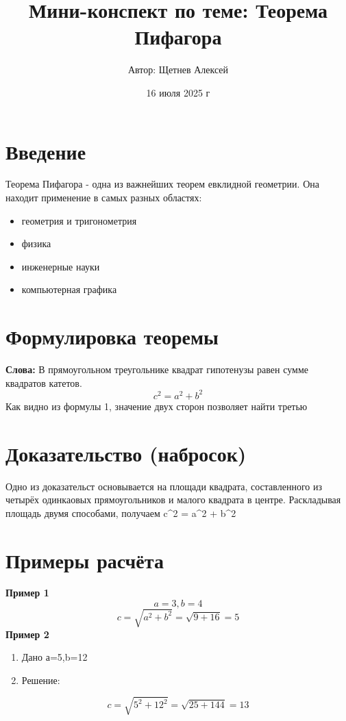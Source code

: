 \documentclass{article}
\title{Мини-конспект по теме: Теорема Пифагора}
\author{Автор: Щетнев Алексей}
\date{16 июля 2025 г}
\begin{document}
\maketitle

\tableofcontents

\newpage
\section{Введение}
Теорема Пифагора - одна из важнейших теорем евклидной геометрии. Она находит
применение в самых разных областях:

\begin{itemize}
    \item геометрия и тригонометрия
    \item физика
    \item инженерные науки
    \item компьютерная графика
\end{itemize}
 
\section{Формулировка теоремы}

\textbf{Слова:} В прямоугольном треугольнике квадрат гипотенузы равен сумме квадратов катетов.
\begin{equation}
c^2 = a^2 + b^2
\end{equation}
Как видно из формулы 1, значение двух сторон позволяет найти третью

\section{Доказательство (набросок)}
Одно из доказательст основывается на площади квадрата, составленного из четырёх одинкаовых прямоугольников и малого квадрата в центре. Раскладывая площадь двумя способами, получаем c^2 = a^2 + b^2

\section{Примеры расчёта}

\textbf{Пример 1}
\[
a=3, b=4
\]
\[
c=\sqrt{a^2+b^2}=\sqrt{9+16}=5
\]
\textbf{Пример 2}
\begin{enumerate}
    \item Дано а=5,b=12
    \item Решение:
\end{enumerate}
\[
c=\sqrt{5^2+12^2 }=\sqrt{25+144}=13
\]
\end{document}
